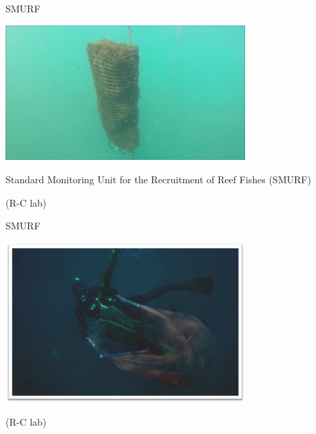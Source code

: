 \documentclass[letter,graphicx]{beamer}
\begin{document}
\begin{frame}{SMURF}

\includegraphics[width = 0.69\textwidth]{mhap_figs/smurf-solo.png}

Standard Monitoring Unit for the Recruitment of Reef Fishes (SMURF)

(R-C lab)
\end{frame}



\begin{frame}{SMURF}

\includegraphics[width = 0.69\textwidth]{mhap_figs/smurf-binkie.png}


(R-C lab)
\end{frame}
\end{document}
